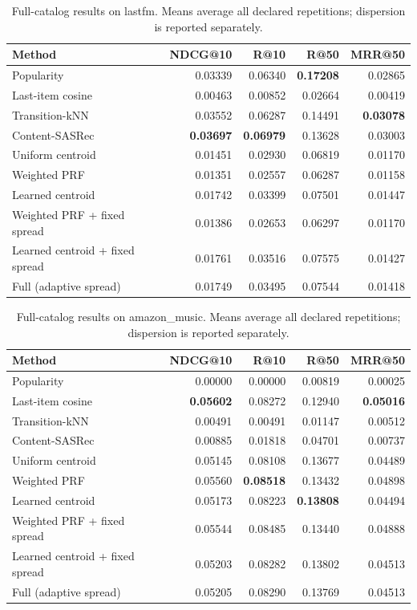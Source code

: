 \begin{table}[t]
\centering\scriptsize
\begin{tabular}{lrrrr}
\toprule
Method & NDCG@10 & R@10 & R@50 & MRR@50 \\
\midrule
Popularity & 0.03339 & 0.06340 & \textbf{0.17208} & 0.02865 \\
Last-item cosine & 0.00463 & 0.00852 & 0.02664 & 0.00419 \\
Transition-kNN & 0.03552 & 0.06287 & 0.14491 & \textbf{0.03078} \\
Content-SASRec & \textbf{0.03697} & \textbf{0.06979} & 0.13628 & 0.03003 \\
Uniform centroid & 0.01451 & 0.02930 & 0.06819 & 0.01170 \\
Weighted PRF & 0.01351 & 0.02557 & 0.06287 & 0.01158 \\
Learned centroid & 0.01742 & 0.03399 & 0.07501 & 0.01447 \\
Weighted PRF + fixed spread & 0.01386 & 0.02653 & 0.06297 & 0.01170 \\
Learned centroid + fixed spread & 0.01761 & 0.03516 & 0.07575 & 0.01427 \\
Full (adaptive spread) & 0.01749 & 0.03495 & 0.07544 & 0.01418 \\
\bottomrule
\end{tabular}
\caption{Full-catalog results on lastfm. Means average all declared repetitions; dispersion is reported separately.}
\label{tab:ecir-results-lastfm}
\end{table}

\begin{table}[t]
\centering\scriptsize
\begin{tabular}{lrrrr}
\toprule
Method & NDCG@10 & R@10 & R@50 & MRR@50 \\
\midrule
Popularity & 0.00000 & 0.00000 & 0.00819 & 0.00025 \\
Last-item cosine & \textbf{0.05602} & 0.08272 & 0.12940 & \textbf{0.05016} \\
Transition-kNN & 0.00491 & 0.00491 & 0.01147 & 0.00512 \\
Content-SASRec & 0.00885 & 0.01818 & 0.04701 & 0.00737 \\
Uniform centroid & 0.05145 & 0.08108 & 0.13677 & 0.04489 \\
Weighted PRF & 0.05560 & \textbf{0.08518} & 0.13432 & 0.04898 \\
Learned centroid & 0.05173 & 0.08223 & \textbf{0.13808} & 0.04494 \\
Weighted PRF + fixed spread & 0.05544 & 0.08485 & 0.13440 & 0.04888 \\
Learned centroid + fixed spread & 0.05203 & 0.08282 & 0.13802 & 0.04513 \\
Full (adaptive spread) & 0.05205 & 0.08290 & 0.13769 & 0.04513 \\
\bottomrule
\end{tabular}
\caption{Full-catalog results on amazon\_music. Means average all declared repetitions; dispersion is reported separately.}
\label{tab:ecir-results-amazon-music}
\end{table}

